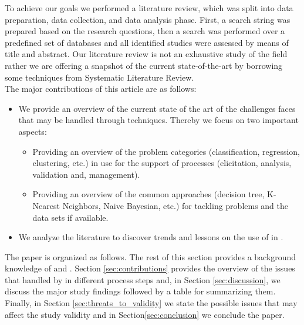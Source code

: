 To achieve our goals we performed a literature review, which was split into data preparation, data collection, and data analysis phase. First, a search string was prepared based on the research questions, then a search was performed over a predefined set of databases and all identified studies were assessed by means of title and abstract. Our literature review is not an exhaustive study of the field rather we are offering a snapshot of the current state-of-the-art by borrowing some techniques from Systematic Literature Review.\\
The major contributions of this article are as follows:
\begin{itemize}
    \item We provide an overview of the current state of the art of the challenges \RE faces that may be handled through \ML techniques. Thereby we focus on two important aspects:
    \begin{itemize}
        \item Providing an overview of the \ML problem categories (classification, regression, clustering, etc.) in use for the support of \RE processes (elicitation, analysis, validation and, management).
        \item Providing an overview of the common \ML approaches (decision tree, K-Nearest Neighbors, Naive Bayesian, etc.) for tackling \RE problems and the data sets if available. 
    \end{itemize}
    \item We analyze the literature to discover trends and lessons on the use of \ML in \RE.
\end{itemize}
The paper is organized as follows. The rest of this section provides a background knowledge of \ML and \RE. Section \ref{sec:contributions} provides the overview of the issues that handled by \ML in different \RE process steps and, in Section \ref{sec:discussion}, we discuss the major study findings followed by a table for summarizing them. Finally, in Section \ref{sec:threats_to_validity} we state the possible issues that may affect the study validity and in Section\ref{sec:conclusion} we conclude the paper.

